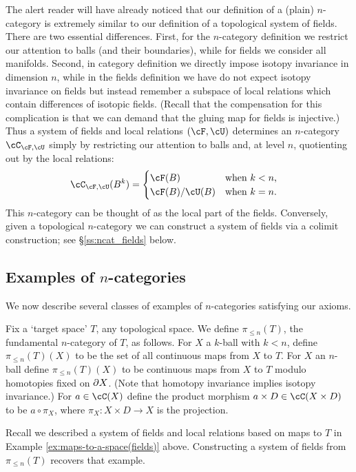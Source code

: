 \medskip

The alert reader will have already noticed that our definition of a (plain) $n$-category
is extremely similar to our definition of a topological system of fields.
There are two essential differences.
First, for the $n$-category definition we restrict our attention to balls
(and their boundaries), while for fields we consider all manifolds.
Second,  in category definition we directly impose isotopy
invariance in dimension $n$, while in the fields definition we have do not expect isotopy invariance on fields
but instead remember a subspace of local relations which contain differences of isotopic fields. 
(Recall that the compensation for this complication is that we can demand that the gluing map for fields is injective.)
Thus a system of fields and local relations $(\cF,\cU)$ determines an $n$-category $\cC_ {\cF,\cU}$ simply by restricting our attention to
balls and, at level $n$, quotienting out by the local relations:
\begin{align*}
\cC_{\cF,\cU}(B^k) & = \begin{cases}\cF(B) & \text{when $k<n$,} \\ \cF(B) / \cU(B) & \text{when $k=n$.}\end{cases}
\end{align*}
This $n$-category can be thought of as the local part of the fields.
Conversely, given a topological $n$-category we can construct a system of fields via 
a colimit construction; see \S \ref{ss:ncat_fields} below.

\subsection{Examples of $n$-categories}
\label{ss:ncat-examples}


We now describe several classes of examples of $n$-categories satisfying our axioms.

\begin{example}
\rm
\label{ex:maps-to-a-space}%
Fix a `target space' $T$, any topological space.
We define $\pi_{\leq n}(T)$, the fundamental $n$-category of $T$, as follows.
For $X$ a $k$-ball with $k < n$, define $\pi_{\leq n}(T)(X)$ to be the set of 
all continuous maps from $X$ to $T$.
For $X$ an $n$-ball define $\pi_{\leq n}(T)(X)$ to be continuous maps from $X$ to $T$ modulo
homotopies fixed on $\partial X$.
(Note that homotopy invariance implies isotopy invariance.)
For $a\in \cC(X)$ define the product morphism $a\times D \in \cC(X\times D)$ to
be $a\circ\pi_X$, where $\pi_X : X\times D \to X$ is the projection.

Recall we described a system of fields and local relations based on maps to $T$ in Example \ref{ex:maps-to-a-space(fields)} above.
Constructing a system of fields from $\pi_{\leq n}(T)$ recovers that example.
\end{example}

